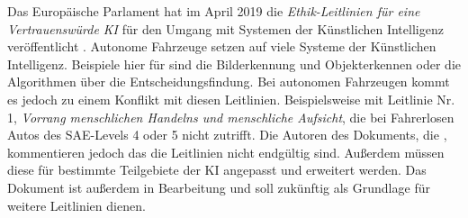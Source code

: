 Das Europäische Parlament hat im April 2019 die \textit{Ethik-Leitlinien für eine Vertrauenswürde KI} für den Umgang mit Systemen der Künstlichen Intelligenz veröffentlicht \cite{ec2019ethics}. Autonome Fahrzeuge setzen auf viele Systeme der Künstlichen Intelligenz. Beispiele hier für sind die Bilderkennung und Objekterkennen oder die Algorithmen über die Entscheidungsfindung. Bei autonomen Fahrzeugen kommt es jedoch zu einem Konflikt mit diesen Leitlinien. Beispielsweise mit Leitlinie Nr. 1, \textit{Vorrang menschlichen Handelns und menschliche Aufsicht}, die bei Fahrerlosen Autos des SAE-Levels 4 oder 5 nicht zutrifft. Die Autoren des Dokuments, die \citeauthor{ec2019ethics}, kommentieren jedoch das die Leitlinien nicht endgültig sind. Außerdem müssen diese für bestimmte Teilgebiete der KI angepasst und erweitert werden. Das Dokument ist außerdem in Bearbeitung und soll zukünftig als Grundlage für weitere Leitlinien dienen.\\